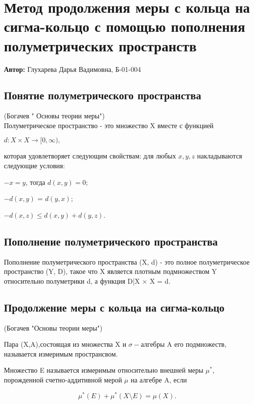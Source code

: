 
\section{Метод продолжения меры с кольца на сигма-кольцо с помощью пополнения полуметрических пространств}

\textbf{Автор:} Глухарева Дарья Вадимовна, Б-01-004

\subsection{Понятие полуметрического пространства} 
(Богачев " Основы теории меры") \\
Полуметрическое пространство - это множество X вместе с функцией

$d : X\times X \rightarrow [0, \infty),$ 

которая удовлетворяет следующим свойствам: для любых $x, y, z$ накладываются следующие условия:

$-x=y$, тогда $d(x, y) = 0$; 

$-d(x, y)$ = $d(y, x)$; 

$-d(x, z) \leq d(x, y) + d(y, z)$.
\subsection{Пополнение полуметрического пространства}
Пополнение полуметрического пространства (X, d) - это полное полуметрическое пространство (Y, D), такое что X является плотным подмножеством Y относительно полуметрики d, а функция D|X × X = d.

\subsection{Продолжение меры с кольца на сигма-кольцо}

(Богачев "Основы теории меры") \\
\begin{definition} Пара (X,A),состоящая из множества X и $\sigma-алгебры$ A его подмножеств, называется измеримым пространсвом.
	\end{definition}
 
\begin{definition} Множество E называется измеримым относительно внешней меры $\mu^*$, порожденной счетно-аддитивной мерой $\mu$ на алгебре A, если

$$\mu^*(E) + \mu^*(X\setminus E) = \mu(X).$$
\end{definition}

